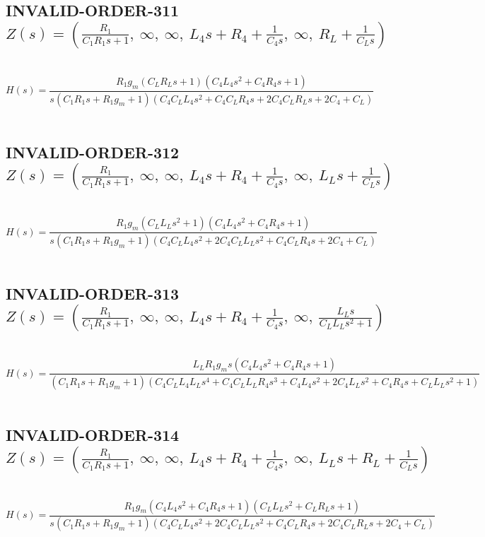 \documentclass{article}
\begin{document}
\subsection{INVALID-ORDER-311 $Z(s) = \left( \frac{R_{1}}{C_{1} R_{1} s + 1}, \  \infty, \  \infty, \  L_{4} s + R_{4} + \frac{1}{C_{4} s}, \  \infty, \  R_{L} + \frac{1}{C_{L} s}\right)$ } \ 
\textbf{\[H(s) = \frac{R_{1} g_{m} \left(C_{L} R_{L} s + 1\right) \left(C_{4} L_{4} s^{2} + C_{4} R_{4} s + 1\right)}{s \left(C_{1} R_{1} s + R_{1} g_{m} + 1\right) \left(C_{4} C_{L} L_{4} s^{2} + C_{4} C_{L} R_{4} s + 2 C_{4} C_{L} R_{L} s + 2 C_{4} + C_{L}\right)}\] } \ 
\subsection{INVALID-ORDER-312 $Z(s) = \left( \frac{R_{1}}{C_{1} R_{1} s + 1}, \  \infty, \  \infty, \  L_{4} s + R_{4} + \frac{1}{C_{4} s}, \  \infty, \  L_{L} s + \frac{1}{C_{L} s}\right)$ } \ 
\textbf{\[H(s) = \frac{R_{1} g_{m} \left(C_{L} L_{L} s^{2} + 1\right) \left(C_{4} L_{4} s^{2} + C_{4} R_{4} s + 1\right)}{s \left(C_{1} R_{1} s + R_{1} g_{m} + 1\right) \left(C_{4} C_{L} L_{4} s^{2} + 2 C_{4} C_{L} L_{L} s^{2} + C_{4} C_{L} R_{4} s + 2 C_{4} + C_{L}\right)}\] } \ 
\subsection{INVALID-ORDER-313 $Z(s) = \left( \frac{R_{1}}{C_{1} R_{1} s + 1}, \  \infty, \  \infty, \  L_{4} s + R_{4} + \frac{1}{C_{4} s}, \  \infty, \  \frac{L_{L} s}{C_{L} L_{L} s^{2} + 1}\right)$ } \ 
\textbf{\[H(s) = \frac{L_{L} R_{1} g_{m} s \left(C_{4} L_{4} s^{2} + C_{4} R_{4} s + 1\right)}{\left(C_{1} R_{1} s + R_{1} g_{m} + 1\right) \left(C_{4} C_{L} L_{4} L_{L} s^{4} + C_{4} C_{L} L_{L} R_{4} s^{3} + C_{4} L_{4} s^{2} + 2 C_{4} L_{L} s^{2} + C_{4} R_{4} s + C_{L} L_{L} s^{2} + 1\right)}\] } \ 
\subsection{INVALID-ORDER-314 $Z(s) = \left( \frac{R_{1}}{C_{1} R_{1} s + 1}, \  \infty, \  \infty, \  L_{4} s + R_{4} + \frac{1}{C_{4} s}, \  \infty, \  L_{L} s + R_{L} + \frac{1}{C_{L} s}\right)$ } \ 
\textbf{\[H(s) = \frac{R_{1} g_{m} \left(C_{4} L_{4} s^{2} + C_{4} R_{4} s + 1\right) \left(C_{L} L_{L} s^{2} + C_{L} R_{L} s + 1\right)}{s \left(C_{1} R_{1} s + R_{1} g_{m} + 1\right) \left(C_{4} C_{L} L_{4} s^{2} + 2 C_{4} C_{L} L_{L} s^{2} + C_{4} C_{L} R_{4} s + 2 C_{4} C_{L} R_{L} s + 2 C_{4} + C_{L}\right)}\] } \ 
\end{document}
